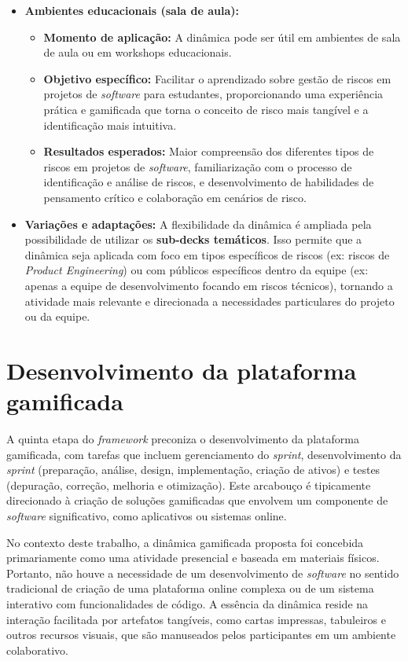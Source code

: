 \documentclass[
	12pt,
	openright,
	twoside,
	a4paper,
	english,
	brazil
	]{abntex2}
\begin{document}
\begin{itemize}
\begin{itemize}
\end{itemize}
\item \textbf{Ambientes educacionais (sala de aula):}
\begin{itemize}
\item \textbf{Momento de aplicação:} A dinâmica pode ser útil em ambientes de sala de aula ou em workshops educacionais. 
\item \textbf{Objetivo específico:} Facilitar o aprendizado sobre gestão de riscos em projetos de \textit{software} para estudantes, proporcionando uma experiência prática e gamificada que torna o conceito de risco mais tangível e a identificação mais intuitiva. 
\item \textbf{Resultados esperados:} Maior compreensão dos diferentes tipos de riscos em projetos de \textit{software}, familiarização com o processo de identificação e análise de riscos, e desenvolvimento de habilidades de pensamento crítico e colaboração em cenários de risco. 
\end{itemize}
\item \textbf{Variações e adaptações:} A flexibilidade da dinâmica é ampliada pela possibilidade de utilizar os \textbf{sub-decks temáticos}. Isso permite que a dinâmica seja aplicada com foco em tipos específicos de riscos (ex: riscos de \textit{Product Engineering}) ou com públicos específicos dentro da equipe (ex: apenas a equipe de desenvolvimento focando em riscos técnicos), tornando a atividade mais relevante e direcionada a necessidades particulares do projeto ou da equipe. 
\end{itemize}

\section{Desenvolvimento da plataforma gamificada}
\label{sec:desenvolvimento-plataforma-gamificada}

A quinta etapa do \textit{framework} preconiza o desenvolvimento da plataforma gamificada, com tarefas que incluem gerenciamento do \textit{sprint}, desenvolvimento da \textit{sprint} (preparação, análise, design, implementação, criação de ativos) e testes (depuração, correção, melhoria e otimização). Este arcabouço é tipicamente direcionado à criação de soluções gamificadas que envolvem um componente de \textit{software} significativo, como aplicativos ou sistemas online.

No contexto deste trabalho, a dinâmica gamificada proposta foi concebida primariamente como uma atividade presencial e baseada em materiais físicos. Portanto, não houve a necessidade de um desenvolvimento de \textit{software} no sentido tradicional de criação de uma plataforma online complexa ou de um sistema interativo com funcionalidades de código. A essência da dinâmica reside na interação facilitada por artefatos tangíveis, como cartas impressas, tabuleiros e outros recursos visuais, que são manuseados pelos participantes em um ambiente colaborativo.
\end{document}
